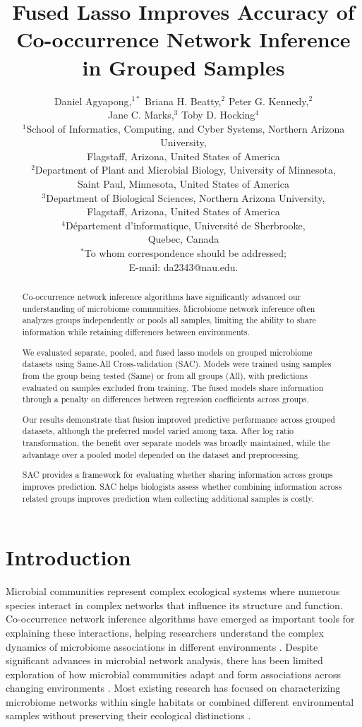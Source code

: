 \documentclass[]{Liebert_Author_revised}
\title{Fused Lasso Improves Accuracy of Co-occurrence Network Inference in Grouped Samples}
\author{\parbox{\dimexpr\textwidth-2\tabcolsep\relax}{\centering Daniel Agyapong,$^{1\ast}$ Briana H. Beatty,$^{2}$ Peter G. Kennedy,$^{2}$\\ 
Jane C. Marks,$^{3}$ Toby D. Hocking$^{4}$\\
{$^{1}$School of Informatics, Computing, and Cyber Systems, Northern Arizona University,}\\
{Flagstaff, Arizona, United States of America}\\
{$^{2}$Department of Plant and Microbial Biology, University of Minnesota,}\\
{Saint Paul, Minnesota, United States of America}\\
{$^{3}$Department of Biological Sciences, Northern Arizona University,}\\
{Flagstaff, Arizona, United States of America}\\
{$^{4}$Département d'informatique, Université de Sherbrooke,}\\
{Quebec, Canada}\\
{$^\ast$To whom correspondence should be addressed;}\\
{E-mail: da2343@nau.edu.}}
}
\date{}
\begin{document}
\maketitle

\begin{abstract}
Co-occurrence network inference algorithms have significantly advanced our understanding of microbiome communities. Microbiome network inference often analyzes groups independently or pools all samples, limiting the ability to share information while retaining differences between environments.

We evaluated separate, pooled, and fused lasso models on grouped microbiome datasets using Same-All Cross-validation (SAC). Models were trained using samples from the group being tested (Same) or from all groups (All), with predictions evaluated on samples excluded from training. The fused models share information through a penalty on differences between regression coefficients across groups.

Our results demonstrate that fusion improved predictive performance across grouped datasets, although the preferred model varied among taxa. After log ratio transformation, the benefit over separate models was broadly maintained, while the advantage over a pooled model depended on the dataset and preprocessing.

SAC provides a framework for evaluating whether sharing information across groups improves prediction. SAC helps biologists assess whether combining information across related groups improves prediction when collecting additional samples is costly.
\end{abstract}

\section{Introduction}
Microbial communities represent complex ecological systems where numerous species interact in complex networks that influence its structure and function.
Co-occurrence network inference algorithms have emerged as important tools for explaining these interactions, helping researchers understand the complex dynamics of microbiome associations in different environments \citep{faust2012microbial,lima2015determinants}.
Despite significant advances in microbial network analysis, there has been limited exploration of how microbial communities adapt and form associations across changing environments \citep{baldo2017convergence}.
Most existing research has focused on characterizing microbiome networks within single habitats or combined different environmental samples without preserving their ecological distinctions \citep{weiss2016correlation}.
\end{document}
